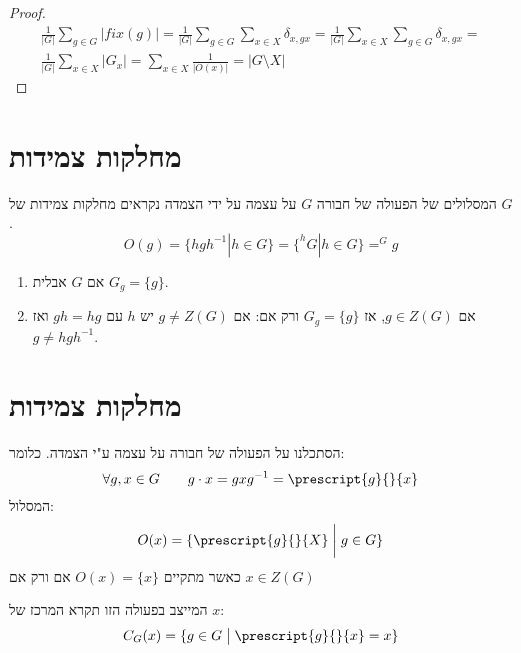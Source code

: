 \documentclass{tstextbook}
\begin{document}
\begin{proof}
\begin{gather*}\frac{1}{|G|}\sum_{g\in G}|fix(g)|=\frac{1}{|G|} \sum_{g \in  G}\sum_{x \in  X}\delta_{x,gx}=\frac{1}{|G|}\sum_{x \in  X}\sum_{g \in  G}\delta_{x,gx}= \\\frac{1}{|G|}\sum_{x \in X}|G_{x}|=\sum_{x \in X} \frac{1}{|O(x)|}=|G\setminus X|
\end{gather*}

\end{proof}
\section{מחלקות צמידות}

\begin{definition}
המסלולים של הפעולה של חבורה \(G\) על עצמה על ידי הצמדה נקראים מחלקות צמידות של \(G\).
$$O(g)=\{ hgh^{-1} |h\in G \}=\{  ^hG | h \in  G \}=  ^Gg$$

\end{definition}
\begin{example}
  \begin{enumerate}
    \item אם \(G\) אבלית \(G_{g}=\{ g \}\). 


    \item אם \(g\in Z(G)\), אז \(G_{g}=\{ g \}\) ורק אם: 
אם \(g\neq Z(G)\) יש \(h\) עם \(gh=hg\) ואז \(g\neq hgh^{-1}\).


  \end{enumerate}
\end{example}
\section{מחלקות צמידות}

הסתכלנו על הפעולה של חבורה על עצמה ע"י הצמדה. כלומר:
$$\forall g,x \in G\qquad g\cdot x=gxg^{-1} = \prescript{g}{}{x}$$
המסלול:
$$O(x)=\{ \prescript{g}{}{X}\;\bigg|\;g\in G \}$$
כאשר מתקיים \(O(x)=\{ x \}\) אם ורק אם \(x \in Z(G)\)

המייצב בפעולה הזו תקרא המרכז של \(x\):
$$C_{G}(x)=\{ g\in G\;\big|\; \prescript{g}{}{x}=x \}$$
\end{document}
